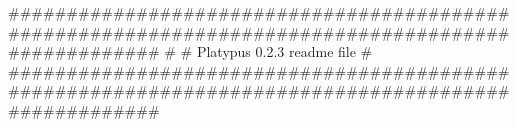 \documentclass[8pt,a4paper]{report}
\begin{document}
###################################################################################################
#
# Platypus 0.2.3 readme file
#
###################################################################################################
\end{document}
